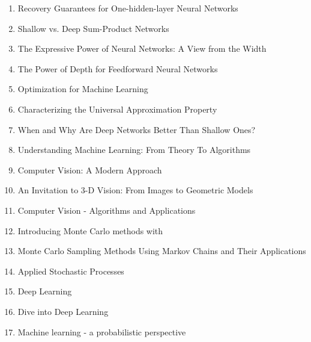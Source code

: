 \documentclass[acmlarge]{acmart}
\begin{document}
\begin{enumerate}
	\item Recovery Guarantees for One-hidden-layer Neural Networks \cite{Zhong2017RecoveryGF} 

	\item Shallow vs. Deep Sum-Product Networks \cite{Delalleau2011ShallowVD} 

	\item The Expressive Power of Neural Networks: A View from the Width \cite{Lu2017TheEP} 

	\item The Power of Depth for Feedforward Neural Networks \cite{Eldan2016ThePO} 

	\item Optimization for Machine Learning \cite{10.5555/2051759} 

	\item Characterizing the Universal Approximation Property \cite{Kratsios2019CharacterizingTU} 

	\item When and Why Are Deep Networks Better Than Shallow Ones? \cite{Mhaskar2017WhenAW} 

	\item Understanding Machine Learning: From Theory To Algorithms \cite{David2015UnderstandingML} 

	\item Computer Vision: A Modern Approach \cite{Forsyth2002ComputerVA} 

	\item An Invitation to 3-D Vision: From Images to Geometric Models \cite{Ma2004AnIT} 

	\item Computer Vision - Algorithms and Applications \cite{Szeliski2011ComputerV} 

	\item Introducing Monte Carlo methods with \cite{Robert2013IntroducingMC} 

	\item Monte Carlo Sampling Methods Using Markov Chains and Their Applications \cite{Hastings1970MonteCS} 

	\item Applied Stochastic Processes \cite{Liao2013AppliedSP} 

	\item Deep Learning \cite{Goodfellow-et-al-2016} 

	\item Dive into Deep Learning \cite{zhang2020dive} 

	\item Machine learning - a probabilistic perspective \cite{Murphy2012MachineL} 


\end{enumerate}
\end{document}

